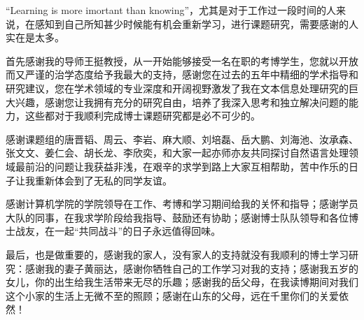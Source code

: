 

\begin{ack}
“Learning is more imortant than knowing”，尤其是对于工作过一段时间的人来说，在感知到自己所知甚少时候能有机会重新学习，进行课题研究，需要感谢的人实在是太多。

首先感谢我的导师王挺教授，从一开始能够接受一名在职的考博学生，您就以开放而又严谨的治学态度给予我最大的支持，感谢您在过去的五年中精细的学术指导和研究建议，您在学术领域的专业深度和开阔视野激发了我在文本信息处理研究的巨大兴趣，感谢您让我拥有充分的研究自由，培养了我深入思考和独立解决问题的能力，这些都对于我顺利完成博士课题研究都是必不可少的。

感谢课题组的唐晋韬、周云、李岩、麻大顺、刘培磊、岳大鹏、刘海池、汝承森、张文文、姜仁会、胡长龙、李欣奕，和大家一起亦师亦友共同探讨自然语言处理领域最前沿的问题让我获益非浅，在艰辛的求学到路上大家互相帮助，苦中作乐的日子让我重新体会到了无私的同学友谊。

感谢计算机学院的学院领导在工作、考博和学习期间给我的关怀和指导；感谢学员大队的同事，在我求学阶段给我指导、鼓励还有协助；感谢博士队队领导和各位博士战友，在一起“共同战斗”的日子永远值得回味。

最后，也是做重要的，感谢我的家人，没有家人的支持就没有我顺利的博士学习研究：感谢我的妻子黄丽达，感谢你牺牲自己的工作学习对我的支持；感谢我五岁的女儿，你的出生给我生活带来无尽的乐趣；感谢我的岳父母，在我读博期间对我们这个小家的生活上无微不至的照顾；感谢在山东的父母，远在千里你们的关爱依然！
\end{ack}
